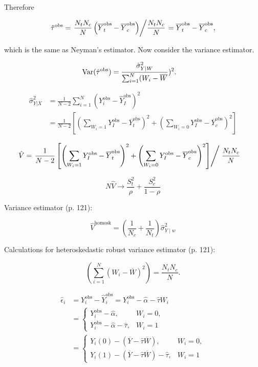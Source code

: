 Therefore

\[
\hat{\tau}^{\text{obs}} =\left. \frac{N_t N_c}{N} \left( \overline{Y}_t^{\text{obs}} - \overline{Y}_c^{\text{obs}} \right)  \middle/ \frac{N_t N_c}{N} \right. = \overline{Y}_t^{\text{obs}} - \overline{Y}_c^{\text{obs}},
\]

which is the same as Neyman's estimator. Now consider the variance estimator. 

\begin{align*}
\Var(\hat{\tau}^{\text{obs}}) & = \frac{\hat{\sigma}^2_{Y| W}}{\sum_{i=1}^N(W_i - \overline{W}})^2.
\end{align*}

\begin{align*}
\hat{\sigma}^2_{Y |X} & = \frac{1}{N-2} \sum_{i=1}^N (Y_i^{\text{obs}} - \hat{Y}_I^{\text{obs}})^2
\\ & = \frac{1}{N-2} \left[ \left(\sum_{W_i = 1}Y_I^{\text{obs}} - \overline{Y}_t^{\text{obs}} \right)^2 + \left(\sum_{W_i = 0}Y_I^{\text{obs}} - \overline{Y}_c^{\text{obs}} \right)^2   \right]
\end{align*}

\begin{align*}
\hat{V} & = \left.  \frac{1}{N-2} \left[ \left(\sum_{W_i = 1}Y_I^{\text{obs}} - \overline{Y}_t^{\text{obs}} \right)^2 + \left(\sum_{W_i = 0}Y_I^{\text{obs}} - \overline{Y}_c^{\text{obs}} \right)^2   \right]\middle/ \right. \frac{N_t N_c}{N}
\end{align*}

\[
N \hat{V} \to \frac{S_t^2}{\rho} + \frac{S_c^2}{1 - \rho}
\]

Variance estimator (p. 121):

\[
\hat{V}^{\text{homosk}}  = \left( \frac{1}{N_c} + \frac{1}{N_t} \right) \hat{\sigma}_{Y\mid w}^2
\]

Calculations for heteroskedastic robust variance estimator (p. 121): 



\[
\left( \sum_{i=1}^N \left( W_i - \overline{W} \right)^2 \right) = \frac{N_t N_c}{N}.
\]

\begin{align*}
\hat{\epsilon}_i & = Y_i^{\text{obs}} - \hat{Y}_i^{\text{obs}} = Y_i^{\text{obs}} - \hat{\alpha} - \hat{\tau} W_i
\\ & =  \begin{cases}
Y_i^{\text{obs}} - \hat{\alpha} , & W_i = 0, \\
 Y_i^{\text{obs}} - \hat{\alpha} - \hat{\tau} , & W_i = 1
\end{cases} 
\\ & =  \begin{cases}
Y_i(0)  -  \left( \overline{Y} - \hat{\tau} \overline{W} \right)  , & W_i = 0, \\
Y_i(1)  - \left( \overline{Y} - \hat{\tau} \overline{W} \right) - \hat{\tau} , & W_i = 1
\end{cases} 
\end{align*}

